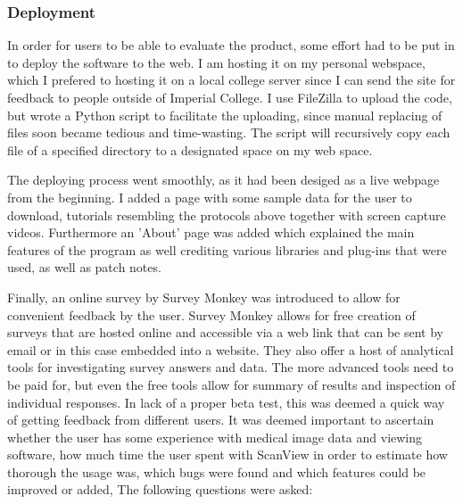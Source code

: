 \documentclass[a4paper,11pt,twoside]{article}
\begin{document}
\subsubsection{Deployment}


In order for users to be able to evaluate the product, some effort had to be put in to deploy the software to the web. I am hosting it on my personal webspace, which I prefered to hosting it on a local college server since I can send the site for feedback to people outside of Imperial College. I use FileZilla to upload the code, but wrote a Python script to facilitate the uploading, since manual replacing of files soon became tedious and time-wasting. The script will recursively copy each file of a specified directory to a designated space on my web space.

The deploying process went smoothly, as it had been desiged as a live webpage from the beginning. I added a page with some sample data for the user to download, tutorials resembling the protocols above together with screen capture videos. Furthermore an 'About' page was added which explained the main features of the program as well crediting various libraries and plug-ins that were used, as well as patch notes. 

Finally, an online survey by Survey Monkey was introduced to allow for convenient feedback by the user. Survey Monkey allows for free creation of surveys that are hosted online and accessible via a web link that can be sent by email or in this case embedded into a website. They also offer a host of analytical tools for investigating survey answers and data. The more advanced tools need to be paid for, but even the free tools allow for summary of results and inspection of individual responses. In lack of a proper beta test, this was deemed a quick way of getting feedback from different users. It was deemed important to ascertain whether the user has some experience with medical image data and viewing software, how much time the user spent with ScanView in order to estimate how thorough the usage was, which bugs were found and which features could be improved or added, The following questions were asked:
\end{document}
